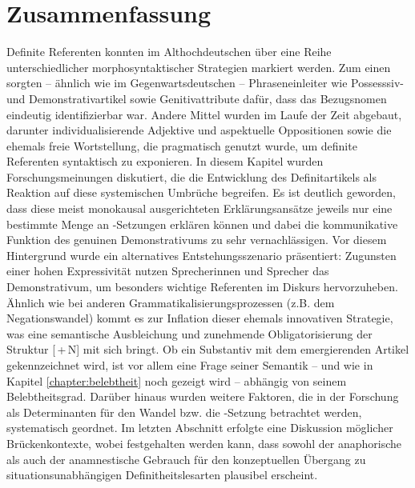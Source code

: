 \section{Zusammenfassung}
Definite Referenten konnten im Althochdeutschen über eine Reihe unterschiedlicher morphosyntaktischer Strategien markiert werden. Zum einen sorgten -- ähnlich wie im Gegenwartsdeutschen -- Phraseneinleiter wie Possesssiv- und Demonstrativartikel sowie Genitivattribute dafür, dass das Bezugsnomen eindeutig identifizierbar war. Andere Mittel wurden im Laufe der Zeit abgebaut, darunter individualisierende Adjektive und aspektuelle Oppositionen sowie die ehemals freie Wortstellung, die pragmatisch genutzt wurde, um definite Referenten syntaktisch zu exponieren. In diesem Kapitel wurden Forschungsmeinungen diskutiert, die die Entwicklung des Definitartikels als Reaktion auf diese systemischen Umbrüche begreifen. Es ist deutlich geworden, dass diese meist monokausal ausgerichteten Erklärungsansätze jeweils nur eine bestimmte Menge an -Setzungen erklären können und dabei die kommunikative Funktion des genuinen Demonstrativums zu sehr vernachlässigen. Vor diesem Hintergrund wurde ein alternatives Entstehungsszenario präsentiert: Zugunsten einer hohen Expressivität nutzen Sprecherinnen und Sprecher das Demonstrativum, um besonders wichtige Referenten im Diskurs hervorzuheben. Ähnlich wie bei anderen Grammatikalisierungsprozessen (z.B. dem Negationswandel) kommt es zur Inflation dieser ehemals innovativen Strategie, was eine semantische Ausbleichung und zunehmende Obligatorisierung der Struktur [\,+\,N] mit sich bringt. Ob ein Substantiv mit dem emergierenden Artikel gekennzeichnet wird, ist vor allem eine Frage seiner Semantik -- und wie in Kapitel \ref{chapter:belebtheit} noch gezeigt wird -- abhängig von seinem Belebtheitsgrad. Darüber hinaus wurden weitere  Faktoren, die in der Forschung als Determinanten für den Wandel bzw. die -Setzung betrachtet werden, systematisch geordnet. Im letzten Abschnitt erfolgte eine Diskussion möglicher Brückenkontexte, wobei festgehalten werden kann, dass sowohl der anaphorische als auch der anamnestische Gebrauch für den konzeptuellen Übergang zu situationsunabhängigen Definitheitslesarten plausibel erscheint. 
